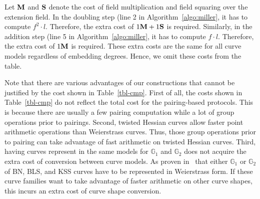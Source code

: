 Let $\textbf{M}$ and $\textbf{S}$ denote the cost of field multiplication and field squaring over the extension field.
In the doubling step (line 2 in Algorithm~\ref{algo:miller},
it has to compute $f^2 \cdot l$.
Therefore, the extra cost of $1\textbf{M} + 1\textbf{S}$ is required.
Similarly, in the addition step (line 5 in Algorithm~\ref{algo:miller},
it has to compute $f \cdot l$.
Therefore, the extra cost of $1\textbf{M}$ is required.
These extra costs are the same for all curve models regardless of embedding degrees.
Hence, we omit these costs from the table.

Note that there are various advantages of our constructions that cannot be justified by the cost shown in Table~\ref{tbl-cmp}.
First of all, the costs shown in Table~\ref{tbl-cmp} do not reflect the total cost for the pairing-based protocols.
This is because there are usually a few pairing computation while a lot of group operations prior to pairings.
Second, twisted Hessian curves allow faster point arithmetic operations than Weierstrass curves.
Thus, those group operations prior to pairing can take advantage of fast arithmetic on twisted Hessian curves.
Third, having curves represent in the same models for $\mathbb{G}_1$ and $\mathbb{G}_2$ does not acquire the extra cost of conversion between curve models.
As proven in~\cite{2013/bos-pairing} that either $\mathbb{G}_1$ or $\mathbb{G}_2$ of BN, BLS, and KSS curves have to be represented in Weierstrass form.
If these curve families want to take advantage of faster arithmetic on other curve shapes, this incurs an extra cost of curve shape conversion.


